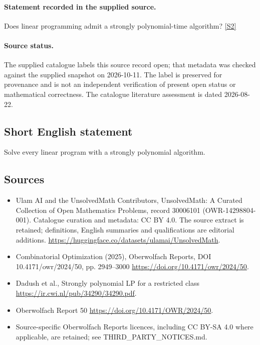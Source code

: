 \documentclass[11pt]{article}
\begin{document}
\paragraph{Statement recorded in the supplied source.}
Does linear programming admit a strongly polynomial-time algorithm? \href{https://doi.org/10.4171/owr/2024/50}{[S2]}
\paragraph{Source status.}
The supplied catalogue labels this source record open; that metadata was checked against the supplied snapshot on 2026-10-11. The label is preserved for provenance and is not an independent verification of present open status or mathematical correctness. The catalogue literature assessment is dated 2026-08-22.
\subsection{Short English statement}
Solve every linear program with a strongly polynomial algorithm.
\subsection{Sources}
\begin{itemize}
\item[S1] Ulam AI and the UnsolvedMath Contributors, UnsolvedMath: A Curated Collection of Open Mathematics Problems, record 30006101 (OWR-14298804-001). Catalogue curation and metadata: CC BY 4.0. The source extract is retained; definitions, English summaries and qualifications are editorial additions.
\url{https://huggingface.co/datasets/ulamai/UnsolvedMath}.
\item[S2] Combinatorial Optimization (2025), Oberwolfach Reports, DOI 10.4171/owr/2024/50, pp. 2949--3000
\url{https://doi.org/10.4171/owr/2024/50}.
\item[S3] Dadush et al., Strongly polynomial LP for a restricted class
\url{https://ir.cwi.nl/pub/34290/34290.pdf}.
\item[S4] Oberwolfach Report 50
\url{https://doi.org/10.4171/OWR/2024/50}.
\item Source-specific Oberwolfach Reports licences, including CC BY-SA 4.0 where applicable, are retained; see THIRD\_PARTY\_NOTICES.md.
\end{itemize}
\end{document}
